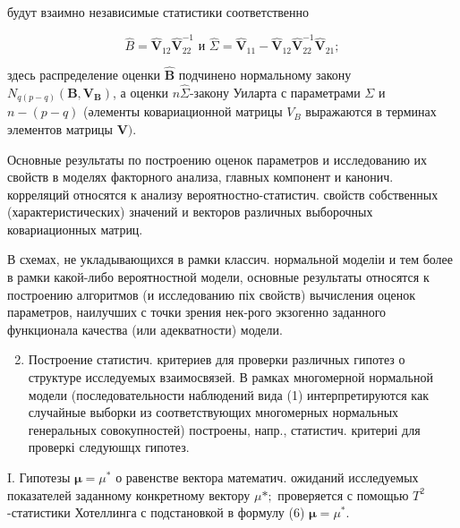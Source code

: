 \documentclass[10pt]{article}
\begin{document}
будут взаимно независимые статистики соответственно



\[

\hat{B}=\hat{\boldsymbol{V}}_{12} \hat{\boldsymbol{V}}_{22}^{-1} \text { и } \hat{\Sigma}=\hat{\boldsymbol{V}}_{11}-\hat{\boldsymbol{V}}_{12} \hat{\boldsymbol{V}}_{22}^{-1} \hat{\boldsymbol{V}}_{21} ;

\]



здесь распределение оценки $\hat{\boldsymbol{B}}$ подчинено нормальному закону $N_{q(p-q)}\left(\boldsymbol{B}, \boldsymbol{V}_{\boldsymbol{B}}\right)$, а оценки $n \hat{\Sigma}$-закону Уиларта с параметрами $\Sigma$ и $n-(p-q)$ (әлементы ковариационной матрицы $V_{B}$ выражаются в терминах элементов матрицы $\boldsymbol{V})$.



Основные результаты по построению оценок параметров и исследованию их свойств в моделях факторного анализа, главных компонент и канонич. корреляций относятся к анализу вероятностно-статистич. свойств собственных (характеристических) значений и векторов различных выборочных ковариационных матриц.



В схемах, не укладывающихся в рамки классич. нормальной моделіи и тем более в рамки какой-либо вероятностной модели, основные результаты относятся к построению алгоритмов (и исследованию піх свойств) вычисления оценок параметров, наилучших с точки зрения нек-рого экзогенно заданного функционала качества (или адекватности) модели.



\begin{enumerate}

  \setcounter{enumi}{1}

  \item Построение статистич. критериев для проверки различных гипотез о структуре исследуемых взаимосвязей. В рамках многомерной нормальной модели (последовательности наблюдений вида (1) интерпретируются как случайные выборки из соответствующих многомерных нормальных генеральных совокупностей) построены, напр., статистич. критериі для проверкі следуюшцх гипотез.

\end{enumerate}



I. Гипотезы $\boldsymbol{\mu}=\mu^{*}$ о равенстве вектора математич. ожиданий исследуемых показателей заданному конкретному вектору $\mu * ;$ проверяется с помощью $T^{2}$-статистики Хотеллинга с подстановкой в формулу (6) $\boldsymbol{\mu}=\mu^{*}$.
\end{document}
